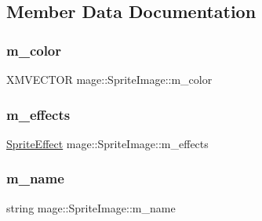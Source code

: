 \subsection{Member Data Documentation}
\hypertarget{classmage_1_1_sprite_image_addcc45aefcf29e2c62d48fd6b2751d7d}{}\label{classmage_1_1_sprite_image_addcc45aefcf29e2c62d48fd6b2751d7d} 
\subsubsection{\texorpdfstring{m\+\_\+color}{m\_color}}
{\footnotesize\ttfamily X\+M\+V\+E\+C\+T\+OR mage\+::\+Sprite\+Image\+::m\+\_\+color\hspace{0.3cm}{\ttfamily [private]}}

\hypertarget{classmage_1_1_sprite_image_a4233e0143d4dd0b609e38f5cbd3aef98}{}\label{classmage_1_1_sprite_image_a4233e0143d4dd0b609e38f5cbd3aef98} 
\subsubsection{\texorpdfstring{m\+\_\+effects}{m\_effects}}
{\footnotesize\ttfamily \hyperlink{namespacemage_a9cfe18123066ba4236f548f9de75d881}{Sprite\+Effect} mage\+::\+Sprite\+Image\+::m\+\_\+effects\hspace{0.3cm}{\ttfamily [private]}}

\hypertarget{classmage_1_1_sprite_image_af172c204ee34926cc1dbead8351de817}{}\label{classmage_1_1_sprite_image_af172c204ee34926cc1dbead8351de817} 
\subsubsection{\texorpdfstring{m\+\_\+name}{m\_name}}
{\footnotesize\ttfamily string mage\+::\+Sprite\+Image\+::m\+\_\+name\hspace{0.3cm}{\ttfamily [private]}}

\hypertarget{classmage_1_1_sprite_image_a936aed1b97b91378724702c33eaf30be}{}\label{classmage_1_1_sprite_image_a936aed1b97b91378724702c33eaf30be} 
